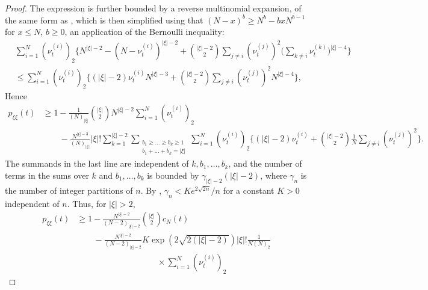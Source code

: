 \begin{proof}
The expression is further bounded by a reverse multinomial expansion, of the same form as \textcite[Equation (8)]{koskela2018}, which is then simplified using that $(N - x)^b \geq N^b - b x N^{ b - 1 }$ 
for $x \leq N$, $b \geq 0$, an application of the Bernoulli inequality:
\begin{align*}
& \sum_{ i = 1 }^N ( \nu_t^{ ( i ) } )_2 
        \Bigg\{ N^{ | \xi | - 2 } - ( N - \nu_t^{ ( i ) } )^{ | \xi | - 2 } 
        + \binom{ | \xi | - 2 }{ 2 } \sum_{ j \neq i } ( \nu_t^{ ( j ) } )^2 
        \Bigg( \sum_{ k \neq i } \nu_t^{ ( k ) } \Bigg)^{ | \xi | - 4 } \Bigg\} \\
&\leq \sum_{ i = 1 }^N ( \nu_t^{ ( i ) } )_2 
        \Bigg\{ ( | \xi | - 2 ) \nu_t^{ ( i ) } N^{ | \xi | - 3 } 
        + \binom{ | \xi | - 2 }{ 2 } \sum_{ j \neq i } ( \nu_t^{ ( j ) } )^2 N^{ | \xi | - 4 } 
        \Bigg\} ,
\end{align*}
Hence
\begin{align*}
p_{ \xi \xi }( t ) 
&\geq 1 - \frac{ 1 }{ ( N )_{ | \xi | } } \binom{|\xi|}{2}
        N^{ | \xi | - 2 } \sum_{ i = 1 }^N ( \nu_t^{ ( i ) } )_2 \\
    &\qquad- \frac{ N^{|\xi|-3} }{ ( N )_{ | \xi | } } |\xi|!
        \sum_{ k = 1 }^{ | \xi | - 2 } 
        \sum_{ \substack{ b_1 \geq \ldots \geq b_k \geq 1 
        \\ b_1 + \ldots + b_k = | \xi | } } 
        \sum_{ i = 1 }^N ( \nu_t^{ ( i ) } )_2 
        \Bigg\{ ( | \xi | - 2 ) \nu_t^{ ( i ) } + \binom{ | \xi | - 2 }{ 2 } \frac{1}{N} 
        \sum_{ j \neq i } ( \nu_t^{ ( j ) } )^2 \Bigg\} .
\end{align*}
The summands in the last line are independent of $k, b_1, \dots, b_k$, and the number of terms in the sums over $k$ and $b_1, \dots, b_k$ is bounded by $\gamma_{|\xi|-2} (|\xi|-2)$, where $\gamma_n$ is the number of integer partitions of $n$.
By \textcite[Section 2]{hardy1918}, $\gamma_n < K e^{ 2 \sqrt{ 2 n } } / n$ for a constant $K > 0$ independent of $n$.
Thus, for $|\xi| > 2$,
\begin{align*}
p_{ \xi \xi }( t ) 
&\geq 1 - \frac{ N^{ | \xi | - 2 } }{ ( N-2 )_{ | \xi | -2} } \binom{|\xi|}{2}
        c_N(t) \\
    &\qquad- \frac{ N^{|\xi|-2} }{ ( N-2 )_{ | \xi | -2} }
        K \exp( 2 \sqrt{2(|\xi|-2)} ) |\xi|!
        \frac{1}{N(N)_2} \\
    &\hspace{4cm}\times \sum_{ i = 1 }^N ( \nu_t^{ ( i ) } )_2

\end{align*}
\end{proof}
